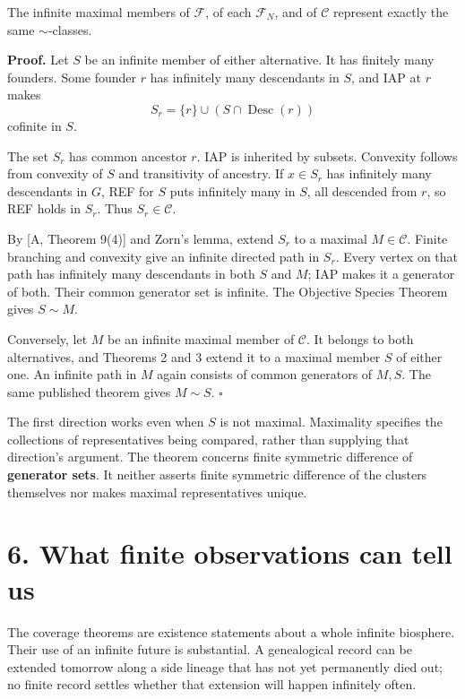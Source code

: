 \documentclass[
  11pt,
  letterpaper,
]{article}
\begin{document}
The infinite maximal members of \(\mathcal F\), of each
\(\mathcal F_N\), and of \(\mathcal C\) represent exactly the same
\(\sim\)-classes.

\textbf{Proof.} Let \(S\) be an infinite member of either alternative.
It has finitely many founders. Some founder \(r\) has infinitely many
descendants in \(S\), and IAP at \(r\) makes \[
             S_r=\{r\}\cup(S\cap\operatorname{Desc}(r))
\] cofinite in \(S\).

The set \(S_r\) has common ancestor \(r\). IAP is inherited by subsets.
Convexity follows from convexity of \(S\) and transitivity of ancestry.
If \(x\in S_r\) has infinitely many descendants in \(G\), REF for \(S\)
puts infinitely many in \(S\), all descended from \(r\), so REF holds in
\(S_r\). Thus \(S_r\in\mathcal C\).

By {[}A, Theorem 9(4){]} and Zorn's lemma, extend \(S_r\) to a maximal
\(M\in\mathcal C\). Finite branching and convexity give an infinite
directed path in \(S_r\). Every vertex on that path has infinitely many
descendants in both \(S\) and \(M\); IAP makes it a generator of both.
Their common generator set is infinite. The Objective Species Theorem
gives \(S\sim M\).

Conversely, let \(M\) be an infinite maximal member of \(\mathcal C\).
It belongs to both alternatives, and Theorems 2 and 3 extend it to a
maximal member \(S\) of either one. An infinite path in \(M\) again
consists of common generators of \(M,S\). The same published theorem
gives \(M\sim S\). \hfill\(\square\)

The first direction works even when \(S\) is not maximal. Maximality
specifies the collections of representatives being compared, rather than
supplying that direction's argument. The theorem concerns finite
symmetric difference of \textbf{generator sets}. It neither asserts
finite symmetric difference of the clusters themselves nor makes maximal
representatives unique.

\section{6. What finite observations can tell
us}\label{what-finite-observations-can-tell-us}

The coverage theorems are existence statements about a whole infinite
biosphere. Their use of an infinite future is substantial. A
genealogical record can be extended tomorrow along a side lineage that
has not yet permanently died out; no finite record settles whether that
extension will happen infinitely often.
\end{document}
